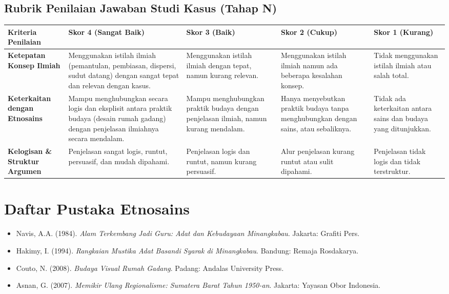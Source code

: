 \documentclass[12pt,a4paper]{article}
\begin{document}
\subsection{Rubrik Penilaian Jawaban Studi Kasus (Tahap N)}

\begin{center}
\begin{tabular}{|p{3cm}|p{3cm}|p{3cm}|p{3cm}|p{3cm}|}
\hline
\textbf{Kriteria Penilaian} & \textbf{Skor 4 (Sangat Baik)} & \textbf{Skor 3 (Baik)} & \textbf{Skor 2 (Cukup)} & \textbf{Skor 1 (Kurang)} \\
\hline
\textbf{Ketepatan Konsep Ilmiah} & Menggunakan istilah ilmiah (pemantulan, pembiasan, dispersi, sudut datang) dengan sangat tepat dan relevan dengan kasus. & Menggunakan istilah ilmiah dengan tepat, namun kurang relevan. & Menggunakan istilah ilmiah namun ada beberapa kesalahan konsep. & Tidak menggunakan istilah ilmiah atau salah total. \\
\hline
\textbf{Keterkaitan dengan Etnosains} & Mampu menghubungkan secara logis dan eksplisit antara praktik budaya (desain rumah gadang) dengan penjelasan ilmiahnya secara mendalam. & Mampu menghubungkan praktik budaya dengan penjelasan ilmiah, namun kurang mendalam. & Hanya menyebutkan praktik budaya tanpa menghubungkan dengan sains, atau sebaliknya. & Tidak ada keterkaitan antara sains dan budaya yang ditunjukkan. \\
\hline
\textbf{Kelogisan \& Struktur Argumen} & Penjelasan sangat logis, runtut, persuasif, dan mudah dipahami. & Penjelasan logis dan runtut, namun kurang persuasif. & Alur penjelasan kurang runtut atau sulit dipahami. & Penjelasan tidak logis dan tidak terstruktur. \\
\hline
\end{tabular}
\end{center}

\vspace{1cm}

\section{Daftar Pustaka Etnosains}
\begin{itemize}
\item Navis, A.A. (1984). \textit{Alam Terkembang Jadi Guru: Adat dan Kebudayaan Minangkabau}. Jakarta: Grafiti Pers.
\item Hakimy, I. (1994). \textit{Rangkaian Mustika Adat Basandi Syarak di Minangkabau}. Bandung: Remaja Rosdakarya.
\item Couto, N. (2008). \textit{Budaya Visual Rumah Gadang}. Padang: Andalas University Press.
\item Asnan, G. (2007). \textit{Memikir Ulang Regionalisme: Sumatera Barat Tahun 1950-an}. Jakarta: Yayasan Obor Indonesia.
\end{itemize}
\end{document}
